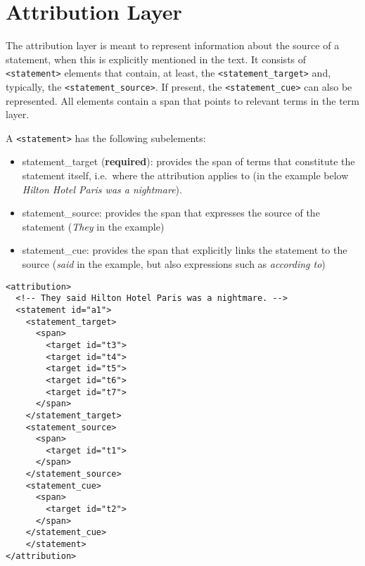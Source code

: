 \section{Attribution Layer}\label{sec:attribution}

The attribution layer is meant to represent information about the source of a statement, when this is explicitly mentioned in the text. It consists of {\tt <statement>} elements that contain, at least, the  {\tt <statement\_target>} and, typically, the {\tt <statement\_source>}. If present, the  {\tt <statement\_cue>} can also be represented. All elements contain a span that points to relevant terms in the term layer.

A  {\tt <statement>} has the following subelements:

\begin{itemize}
\item statement\_target (\textbf{required}): provides the span of terms that constitute the statement itself, i.e.\ where the attribution applies to (in the example below \textit{Hilton Hotel Paris was a nightmare}).
\item statement\_source: provides the span that expresses the source of the statement (\textit{They} in the example)
\item statement\_cue: provides the span that explicitly links the statement to the source (\textit{said} in the example, but also expressions such as \textit{according to})
\end{itemize}  

\begin{Verbatim}[fontsize=\small]
<attribution>
  <!-- They said Hilton Hotel Paris was a nightmare. -->
  <statement id="a1">
    <statement_target>
      <span>
        <target id="t3">
        <target id="t4">
        <target id="t5">
        <target id="t6">
        <target id="t7">
      </span>
    </statement_target>
    <statement_source>
      <span>
        <target id="t1">
      </span>
    </statement_source>
    <statement_cue>
      <span>
        <target id="t2">
      </span>
    </statement_cue>
    </statement>
</attribution>
\end{Verbatim}


